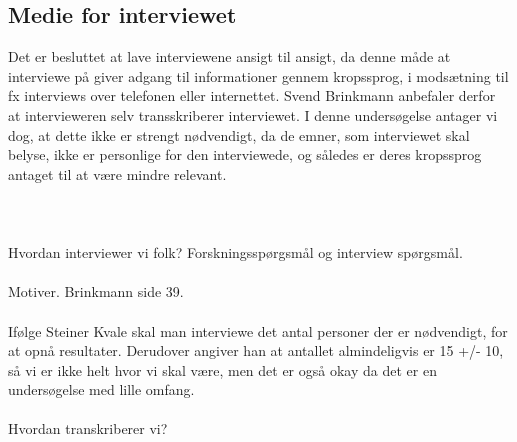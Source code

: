 \subsection {Medie for interviewet}
Det er besluttet at lave interviewene ansigt til ansigt, da denne måde at interviewe på giver adgang til informationer gennem kropssprog, i modsætning til fx interviews over telefonen eller internettet. Svend Brinkmann anbefaler derfor at intervieweren selv transskriberer interviewet.\citep{brinkmann2014} I denne undersøgelse antager vi dog, at dette ikke er strengt nødvendigt, da de emner, som interviewet skal belyse, ikke er personlige for den interviewede, og således er deres kropssprog antaget til at være mindre relevant.
\\
\\
\\
\\
Hvordan interviewer vi folk? Forskningsspørgsmål og interview spørgsmål.
\\
\\
Motiver. Brinkmann side 39.
\\
\\
Ifølge Steiner Kvale skal man interviewe det antal personer der er nødvendigt, for at opnå resultater. Derudover angiver han at antallet almindeligvis er 15 +/- 10, så vi er ikke helt hvor vi skal være, men det er også okay da det er en undersøgelse med lille omfang.
\cite{kvale2015}
\\
\\
Hvordan transkriberer vi? 
\\
